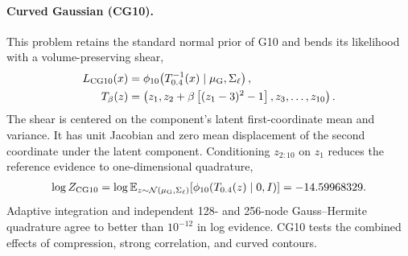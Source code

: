 \documentclass[pdflatex,sn-basic,icol]{sn-jnl}
\newcommand{\E}{\mathbb{E}}
\theoremstyle{plain}
\theoremstyle{definition}
\begin{document}
\paragraph{Curved Gaussian (CG10).}
This problem retains the standard normal prior of G10 and bends its likelihood with a volume-preserving shear,
\begin{align}
    L_{\rm CG10}(x)&=\phi_{10}\!\left(T_{0.4}^{-1}(x)\mid\mu_{\rm G},\Sigma_\ell\right),
    \label{eq:cg10_likelihood}\\
    T_\beta(z)&=\left(z_1,z_2+\beta\left[(z_1-3)^2-1\right],z_3,\ldots,z_{10}\right).
\end{align}
The shear is centered on the component's latent first-coordinate mean and variance.
It has unit Jacobian and zero mean displacement of the second coordinate under the latent component.
Conditioning $z_{2:10}$ on $z_1$ reduces the reference evidence to one-dimensional quadrature,
\begin{align}
    \log Z_{\rm CG10}
    =\log\E_{z\sim\mathcal{N}(\mu_{\rm G},\Sigma_\ell)}
       \!\left[\phi_{10}(T_{0.4}(z)\mid0,I)\right]
    =-14.59968329. \label{eq:cg10_evidence}
\end{align}
Adaptive integration and independent 128- and 256-node Gauss--Hermite quadrature agree to better than $10^{-12}$ in log evidence.
CG10 tests the combined effects of compression, strong correlation, and curved contours.
\end{document}
